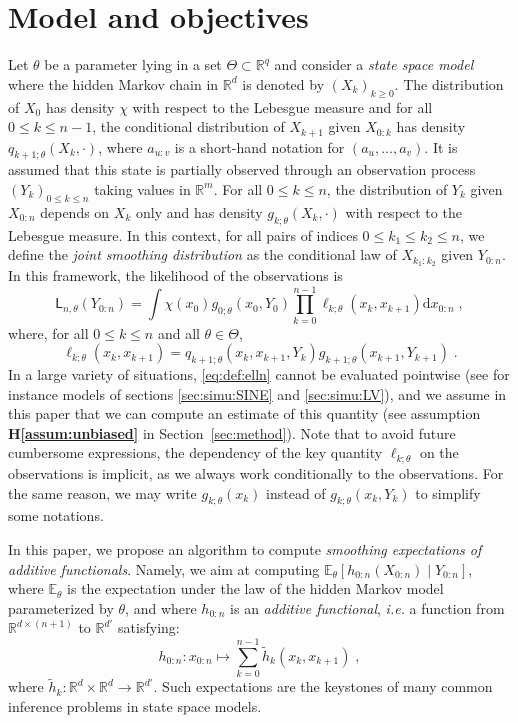 \documentclass[12pt]{article}
\newcommand{\md}[1]{g_{#1}}
\newcommand{\llh}[1]{\mathsf{L}_{#1}}
\newcommand{\parvec}{\theta}
\newcommand{\parspace}{\Theta}
\newcommand{\af}[1]{h_{#1}}
\newcommand{\hd}[1]{q_{#1}}
\newcommand{\addf}[1]{\termletter_{#1}}
\newcommand{\termletter}{\tilde{h}}
\def\pE{\mathbb{E}}
\newcommand{\rset}{\ensuremath{\mathbb{R}}}
\newcommand{\rmd}{\ensuremath{\mathrm{d}}}
\newcommand{\eqsp}{\;}
\newcommand{\qg}[1]{\ell_{#1}}
\begin{document}
\section{Model and objectives}
\label{sec:model}

Let $\parvec$ be a parameter lying in a set $\Theta\subset \rset^q$ and consider a  \textit{state space model} where the hidden Markov chain  in $\rset^d$ is denoted by $(X_k)_{k\geqslant 0}$. The distribution of $X_0$ has density $\chi$ with respect to the Lebesgue measure and for all $0\leqslant k \leqslant n-1$, the conditional distribution of $X_{k+1} $ given $X_{0:k}$ has density $\hd{k+1;\parvec}(X_{k},\cdot)$, where $a_{u:v}$ is a short-hand notation for $(a_u,\ldots,a_v)$. 
It is assumed that this state  is partially observed  through an observation process $(Y_k)_{0\leqslant k \leqslant n}$ taking values in $\rset^m$. 
For all $0\leqslant k \leqslant n$, the distribution of $Y_k$ given $X_{0:n}$ depends on $X_k$ only and has density $\md{k;\parvec}(X_k,\cdot)$ with respect to the Lebesgue measure. 
In this context, for all pairs of indices $0\leqslant k_1 \leqslant k_2 \leqslant n$, we define the \textit{joint smoothing distribution} as the conditional law of $X_{k_1:k_2}$ given $Y_{0:n}$. 
In this framework, the likelihood of the observations  is
$$
\llh{n,\parvec}(Y_{0:n})  = \int \chi(x_0)\md{0;\parvec}(x_{0},Y_{0})\prod_{k=0}^{n-1}\qg{k;\parvec}(x_{k},x_{k+1})\rmd x_{0:n}\eqsp,
$$
 where, for all $0\leqslant k \leqslant n$ and all $\parvec\in\parspace$,
\begin{equation}
\label{eq:def:elln}
\qg{k;\parvec}(x_{k},x_{k+1}) = \hd{k+1;\parvec}(x_{k}, x_{k+1}, Y_{k})\md{k+1;\parvec}(x_{k+1},Y_{k+1})\eqsp.
\end{equation}
In a large variety of situations, \eqref{eq:def:elln} cannot be evaluated pointwise  (see for instance models of sections \ref{sec:simu:SINE} and \ref{sec:simu:LV}), and we assume in this paper that we can compute an estimate of this quantity (see assumption \textbf{H\ref{assum:unbiased}} in Section~\ref{sec:method}).
Note that to avoid future cumbersome expressions, the dependency of the key quantity $\qg{k;\parvec}$ on the observations is implicit, as we always work conditionally to the observations. For the same reason, we may write $\md{k;\parvec}(x_{k})$ instead of $\md{k;\parvec}(x_{k},Y_{k})$ to simplify some notations.


In this paper, we propose an algorithm to compute \textit{smoothing expectations of additive functionals}. 
Namely, we aim at computing $\pE_\parvec \left[\af{0:n}(X_{0:n})\middle | Y_{0:n}\right]$,  where $\pE_\parvec$ is the expectation under the law of the hidden Markov model parameterized by $\parvec$, and where $\af{0:n}$ is an \textit{additive functional}, \textit{i.e.} a function from $\rset^{d \times (n + 1)}$ to $\rset^{d'}$ satisfying:
\begin{equation}
\label{eq:additive:functional}
\af{0:n}: x_{0:n} \mapsto \sum_{k=0}^{n-1}\addf{k}(x_{k},x_{k+1})\eqsp,
\end{equation}
where $\addf{k}:\rset^{d} \times \rset^{d}\to\rset^{d'}$.
Such expectations are the keystones of many common inference problems in state space models.
\end{document}
